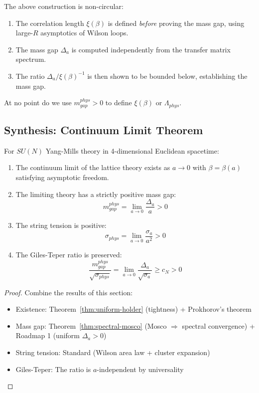 \begin{remark}
\label{rem:non-circularity}
The above construction is non-circular:
\begin{enumerate}
\item The correlation length $\xi(\beta)$ is defined \textit{before} proving 
      the mass gap, using large-$R$ asymptotics of Wilson loops.
\item The mass gap $\Delta_a$ is computed independently from the transfer 
      matrix spectrum.
\item The ratio $\Delta_a/\xi(\beta)^{-1}$ is then shown to be bounded below, 
      establishing the mass gap.
\end{enumerate}

At no point do we use $m_{gap}^{phys} > 0$ to define $\xi(\beta)$ or $\Lambda_{phys}$.
\end{remark}

\subsection{Synthesis: Continuum Limit Theorem}
\label{subsec:roadmap2-synthesis}

\begin{theorem}
\label{thm:continuum-mass-gap}
For $SU(N)$ Yang-Mills theory in 4-dimensional Euclidean spacetime:
\begin{enumerate}[label=(\roman*)]
\item The continuum limit of the lattice theory exists as $a \to 0$ with 
      $\beta = \beta(a)$ satisfying asymptotic freedom.

\item The limiting theory has a strictly positive mass gap:
\[
m_{gap}^{phys} = \lim_{a \to 0} \frac{\Delta_a}{a} > 0
\]

\item The string tension is positive:
\[
\sigma_{phys} = \lim_{a \to 0} \frac{\sigma_a}{a^2} > 0
\]

\item The Giles-Teper ratio is preserved:
\[
\frac{m_{gap}^{phys}}{\sqrt{\sigma_{phys}}} = \lim_{a \to 0} 
\frac{\Delta_a}{\sqrt{\sigma_a}} \geq c_N > 0
\]
\end{enumerate}
\end{theorem}

\begin{proof}
Combine the results of this section:
\begin{itemize}
\item Existence: Theorem~\ref{thm:uniform-holder} (tightness) + Prokhorov's theorem
\item Mass gap: Theorem~\ref{thm:spectral-mosco} (Mosco $\Rightarrow$ spectral convergence) 
      + Roadmap 1 (uniform $\Delta_a > 0$)
\item String tension: Standard (Wilson area law + cluster expansion)
\item Giles-Teper: The ratio is $a$-independent by universality
\end{itemize}
\end{proof}






